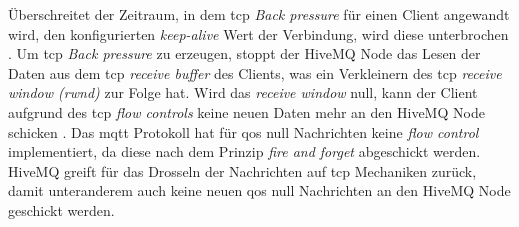 Überschreitet der Zeitraum, in dem \ac{tcp} \textit{Back pressure} für einen Client angewandt wird, den konfigurierten \textit{keep-alive} Wert der Verbindung, wird diese unterbrochen \cite{ClusterOverloadProtection}.
Um \ac{tcp} \textit{Back pressure} zu erzeugen, stoppt der HiveMQ Node das Lesen der Daten aus dem \ac{tcp} \textit{receive buffer} des Clients, was ein Verkleinern des \ac{tcp} \textit{receive window (rwnd)} zur Folge hat. Wird das \textit{receive window} null, kann der Client aufgrund des \ac{tcp} \textit{flow controls} keine neuen Daten mehr an den HiveMQ Node schicken \cite{TCPFlowControl}.
Das \ac{mqtt} Protokoll hat für \ac{qos} null Nachrichten keine \textit{flow control} implementiert, da diese nach dem Prinzip \textit{fire and forget} abgeschickt werden.
HiveMQ greift für das Drosseln der Nachrichten auf \ac{tcp} Mechaniken zurück, damit unteranderem auch keine neuen \ac{qos} null Nachrichten an den HiveMQ Node geschickt werden.

